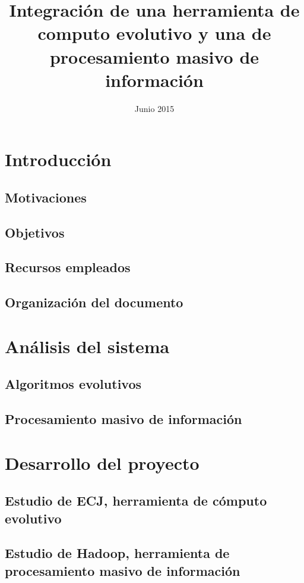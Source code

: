 \documentclass{estilos-y-libreria}
\title{Integración de una herramienta de computo evolutivo y una de procesamiento masivo de informaci\'on}
\date{Junio 2015}
\begin{document}
\frontmatter
\hacerportada
\hacercontraportada
\newpage{\ }
\thispagestyle{empty} 
\hacerprologo
\haceragradecimientos
\setcounter{secnumdepth}{2}
\setcounter{tocdepth}{2}
\tableofcontents
\listoffigures
\listoftables

\mainmatter

\chapter{Introducci\'on}
	\section{Motivaciones\label{motivaciones}}
		
	\section{Objetivos}
	\section{Recursos empleados}
	\section{Organizaci\'on del documento}

\chapter{An\'alisis del sistema}
	
	\section{Algoritmos evolutivos}
		
	\section{Procesamiento masivo de informaci\'on}
		

\chapter{Desarrollo del proyecto}
	
	\section{Estudio de ECJ, herramienta de c\'omputo evolutivo\label{desarrollo-ecj}}
		
	\section{Estudio de Hadoop, herramienta de procesamiento masivo de informaci\'on\label{desarrollo-hadoop}}
		
\end{document}
